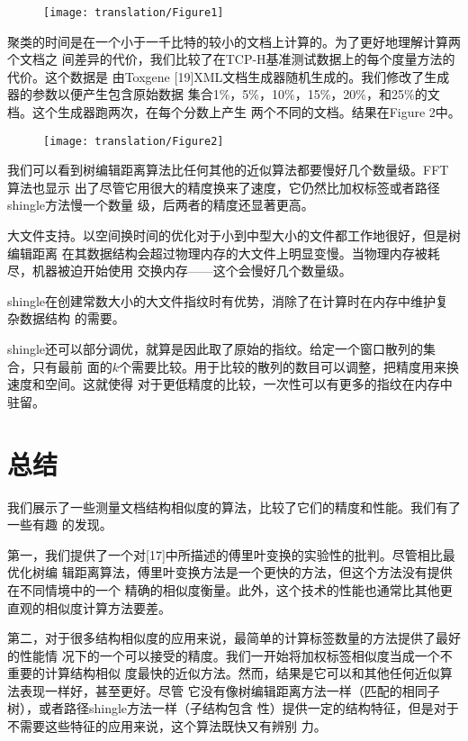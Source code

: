 \begin{figure}[h]
  \centering
  \texttt{[image: translation/Figure1]}
\end{figure}

聚类的时间是在一个小于一千比特的较小的文档上计算的。为了更好地理解计算两个文档之
间差异的代价，我们比较了在TCP-H基准测试数据上的每个度量方法的代价。这个数据是
由Toxgene [19]XML文档生成器随机生成的。我们修改了生成器的参数以便产生包含原始数据
集合1\%，5\%，10\%，15\%，20\%，和25\%的文档。这个生成器跑两次，在每个分数上产生
两个不同的文档。结果在Figure 2中。
\begin{figure}[h]
  \centering
  \texttt{[image: translation/Figure2]}
\end{figure}

我们可以看到树编辑距离算法比任何其他的近似算法都要慢好几个数量级。FFT算法也显示
出了尽管它用很大的精度换来了速度，它仍然比加权标签或者路径shingle方法慢一个数量
级，后两者的精度还显著更高。

大文件支持。以空间换时间的优化对于小到中型大小的文件都工作地很好，但是树编辑距离
在其数据结构会超过物理内存的大文件上明显变慢。当物理内存被耗尽，机器被迫开始使用
交换内存——这个会慢好几个数量级。

shingle在创建常数大小的大文件指纹时有优势，消除了在计算时在内存中维护复杂数据结构
的需要。

shingle还可以部分调优，就算是因此取了原始的指纹。给定一个窗口散列的集合，只有最前
面的$k$个需要比较。用于比较的散列的数目可以调整，把精度用来换速度和空间。这就使得
对于更低精度的比较，一次性可以有更多的指纹在内存中驻留。

\section{总结}
我们展示了一些测量文档结构相似度的算法，比较了它们的精度和性能。我们有了一些有趣
的发现。

第一，我们提供了一个对[17]中所描述的傅里叶变换的实验性的批判。尽管相比最优化树编
辑距离算法，傅里叶变换方法是一个更快的方法，但这个方法没有提供在不同情境中的一个
精确的相似度衡量。此外，这个技术的性能也通常比其他更直观的相似度计算方法要差。

第二，对于很多结构相似度的应用来说，最简单的计算标签数量的方法提供了最好的性能情
况下的一个可以接受的精度。我们一开始将加权标签相似度当成一个不重要的计算结构相似
度最快的近似方法。然而，结果是它可以和其他任何近似算法表现一样好，甚至更好。尽管
它没有像树编辑距离方法一样（匹配的相同子树），或者路径shingle方法一样（子结构包含
性）提供一定的结构特征，但是对于不需要这些特征的应用来说，这个算法既快又有辨别
力。

